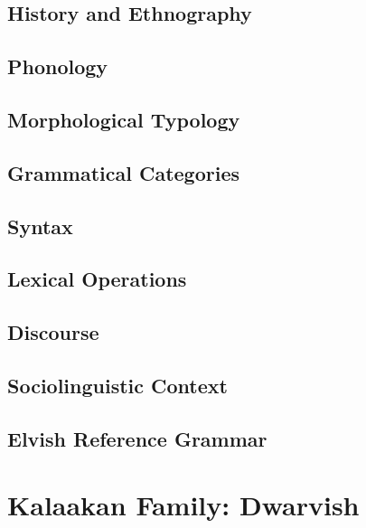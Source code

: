 \documentclass[12pt,letterpaper,openany,twoside]{memoir}
\let\originalpart=\part
\def\part{\cleardoublepage\originalpart}
\begin{document}
\chapter{History and Ethnography}

\chapter{Phonology}

\chapter{Morphological Typology}

\chapter{Grammatical Categories}

\chapter{Syntax}

\chapter{Lexical Operations}

\chapter{Discourse}

\chapter{Sociolinguistic Context}

\chapter{Elvish Reference Grammar}

\part{Kalaakan Family: Dwarvish}
\end{document}
